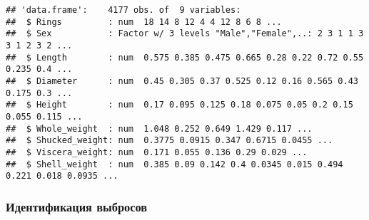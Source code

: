 \documentclass[]{article}
\newenvironment{Shaded}{\begin{snugshade}}{\end{snugshade}}
\newcommand{\CommentTok}[1]{\textcolor[rgb]{0.56,0.35,0.01}{\textit{#1}}}
\newcommand{\DataTypeTok}[1]{\textcolor[rgb]{0.13,0.29,0.53}{#1}}
\newcommand{\KeywordTok}[1]{\textcolor[rgb]{0.13,0.29,0.53}{\textbf{#1}}}
\newcommand{\NormalTok}[1]{#1}
\newcommand{\OperatorTok}[1]{\textcolor[rgb]{0.81,0.36,0.00}{\textbf{#1}}}
\newcommand{\StringTok}[1]{\textcolor[rgb]{0.31,0.60,0.02}{#1}}
\begin{document}
\begin{Shaded}
\end{Shaded}

\begin{verbatim}
## 'data.frame':    4177 obs. of  9 variables:
##  $ Rings         : num  18 14 8 12 4 4 12 8 6 8 ...
##  $ Sex           : Factor w/ 3 levels "Male","Female",..: 2 3 1 1 3 3 1 2 3 2 ...
##  $ Length        : num  0.575 0.385 0.475 0.665 0.28 0.22 0.72 0.55 0.235 0.4 ...
##  $ Diameter      : num  0.45 0.305 0.37 0.525 0.12 0.16 0.565 0.43 0.175 0.3 ...
##  $ Height        : num  0.17 0.095 0.125 0.18 0.075 0.05 0.2 0.15 0.055 0.115 ...
##  $ Whole_weight  : num  1.048 0.252 0.649 1.429 0.117 ...
##  $ Shucked_weight: num  0.3775 0.0915 0.347 0.6715 0.0455 ...
##  $ Viscera_weight: num  0.171 0.055 0.136 0.29 0.029 ...
##  $ Shell_weight  : num  0.385 0.09 0.142 0.4 0.0345 0.015 0.494 0.221 0.018 0.0935 ...
\end{verbatim}

\hypertarget{ux438ux434ux435ux43dux442ux438ux444ux438ux43aux430ux446ux438ux44f-ux432ux44bux431ux440ux43eux441ux43eux432}{%
\subsubsection{Идентификация
выбросов}\label{ux438ux434ux435ux43dux442ux438ux444ux438ux43aux430ux446ux438ux44f-ux432ux44bux431ux440ux43eux441ux43eux432}}
\end{document}
